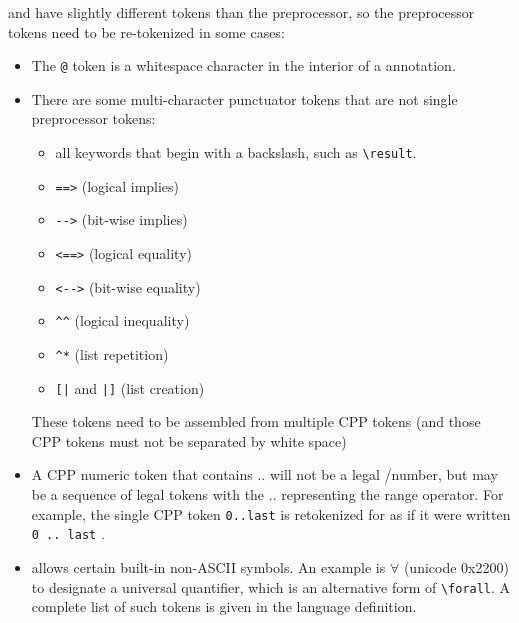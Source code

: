 \acsl and \acslpp have slightly different tokens than the preprocessor, so the preprocessor tokens need to be re-tokenized in some cases:
\begin{itemize}
	\item The \verb|@| token is a whitespace character in the interior of a \acslb annotation.
	\item There are some \acslb multi-character punctuator tokens that are not
	single preprocessor tokens:
	\begin{itemize}
        		\item all \acslb keywords that begin with a backslash, such as \verb|\result|.
		\item \verb|==>| (logical implies)
		\item \verb|-->| (bit-wise implies)
		\item \verb|<==>| (logical equality)
		\item \verb|<-->| (bit-wise equality)
		\item \verb|^^| (logical inequality)
		\item \verb|^*| (list repetition)
		\item \verb:[|: and \verb:|]: (list creation)
	\end{itemize}
	These \acslb tokens need to be assembled from multiple CPP tokens (and those CPP tokens must not be separated by white space)
	\item A CPP numeric token that contains .. will not be a legal \C/\cpp number, but may be a sequence of
 legal \acslb tokens with the .. representing the range operator.  For example, the single CPP token \texttt{0..last} is retokenized for \acslb as if it were written \texttt{0 .. last} .
	\item \acslb allows certain built-in non-ASCII symbols.
    An example is 
		$\forall$ (unicode 0x2200) to designate a universal quantifier,
    which is an alternative form of \verb|\forall|.
    A complete list of such tokens is given  in the \acslb language definition.
\end{itemize}

